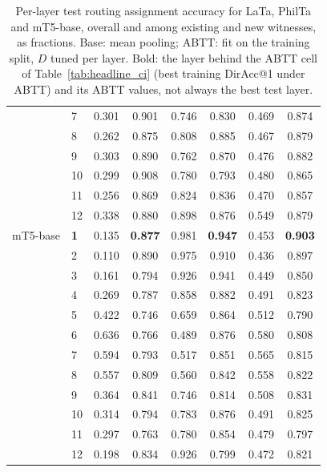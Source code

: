 \begin{table}[t]
\begin{tabular}{llcccccc}
 & 7 & 0.301 & 0.901 & 0.746 & 0.830 & 0.469 & 0.874 \\
 & 8 & 0.262 & 0.875 & 0.808 & 0.885 & 0.467 & 0.879 \\
 & 9 & 0.303 & 0.890 & 0.762 & 0.870 & 0.476 & 0.882 \\
 & 10 & 0.299 & 0.908 & 0.780 & 0.793 & 0.480 & 0.865 \\
 & 11 & 0.256 & 0.869 & 0.824 & 0.836 & 0.470 & 0.857 \\
 & 12 & 0.338 & 0.880 & 0.898 & 0.876 & 0.549 & 0.879 \\
\midrule
mT5-base & \textbf{1} & 0.135 & \textbf{0.877} & 0.981 & \textbf{0.947} & 0.453 & \textbf{0.903} \\
 & 2 & 0.110 & 0.890 & 0.975 & 0.910 & 0.436 & 0.897 \\
 & 3 & 0.161 & 0.794 & 0.926 & 0.941 & 0.449 & 0.850 \\
 & 4 & 0.269 & 0.787 & 0.858 & 0.882 & 0.491 & 0.823 \\
 & 5 & 0.422 & 0.746 & 0.659 & 0.864 & 0.512 & 0.790 \\
 & 6 & 0.636 & 0.766 & 0.489 & 0.876 & 0.580 & 0.808 \\
 & 7 & 0.594 & 0.793 & 0.517 & 0.851 & 0.565 & 0.815 \\
 & 8 & 0.557 & 0.809 & 0.560 & 0.842 & 0.558 & 0.822 \\
 & 9 & 0.364 & 0.841 & 0.746 & 0.814 & 0.508 & 0.831 \\
 & 10 & 0.314 & 0.794 & 0.783 & 0.876 & 0.491 & 0.825 \\
 & 11 & 0.297 & 0.763 & 0.780 & 0.854 & 0.479 & 0.797 \\
 & 12 & 0.198 & 0.834 & 0.926 & 0.799 & 0.472 & 0.821 \\
\bottomrule
\end{tabular}
\caption{Per-layer test routing assignment accuracy for LaTa, PhilTa and mT5-base, overall and among existing and new witnesses, as fractions. Base: mean pooling; ABTT: fit on the training split, $D$ tuned per layer. Bold: the layer behind the ABTT cell of Table~\ref{tab:headline_ci} (best training DirAcc@1 under ABTT) and its ABTT values, not always the best test layer.}
\label{tab:taskB_routing_main}
\end{table}
